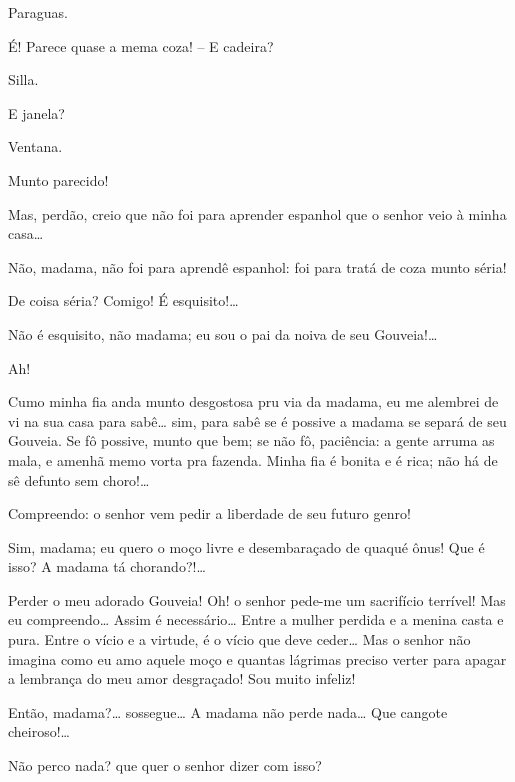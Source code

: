  Paraguas.

 É! Parece quase a mema coza! -- E cadeira?

 Silla.

 E janela?

 Ventana.

 Munto parecido!

 Mas, perdão, creio que não foi para aprender espanhol que o senhor
veio à minha casa\ldots{}

 Não, madama, não foi para aprendê espanhol: foi para tratá de
coza munto séria!

 De coisa séria? Comigo! É esquisito!\ldots{}

 Não é esquisito, não madama; eu sou o pai da noiva de seu
Gouveia!\ldots{}

 Ah!

 Cumo minha fia anda munto desgostosa pru via da madama, eu me
alembrei de vi na sua casa para sabê\ldots{} sim, para sabê se é possive a
madama se separá de seu Gouveia. Se fô possive, munto que bem; se não fô, paciência:
a gente arruma as mala, e amenhã memo vorta pra fazenda. Minha fia é bonita e é
rica; não há de sê defunto sem choro!\ldots{}

 Compreendo: o senhor vem pedir a liberdade de seu futuro genro!

 Sim, madama; eu quero o moço livre e desembaraçado de quaqué
ônus!  Que é isso? A madama tá
chorando?!\ldots{}

  Perder o meu adorado Gouveia! Oh! o senhor pede-me
um sacrifício terrível!  Mas eu compreendo\ldots{} Assim é necessário\ldots{}
Entre a mulher perdida e a menina casta e pura. Entre o vício e a virtude, é o
vício que deve ceder\ldots{} Mas o senhor não imagina como eu amo aquele moço e quantas
lágrimas preciso verter para apagar a lembrança do meu amor desgraçado!  Sou muito infeliz!

  Então,
madama?\ldots{} sossegue\ldots{} A madama não perde nada\ldots{}  Que cangote cheiroso!\ldots{}

  Não perco nada? que
quer o senhor dizer com isso?

